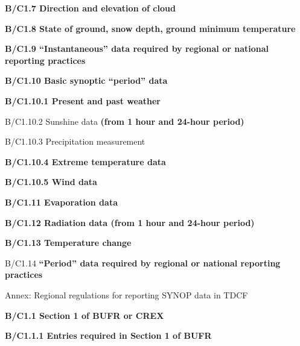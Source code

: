 \textbf{B/C1.7 Direction and elevation of cloud}

\textbf{B/C1.8 State of ground, snow depth, ground minimum temperature}

\textbf{B/C1.9 ``Instantaneous'' data required by regional or national reporting practices}

\textbf{B/C1.10 Basic synoptic ``period'' data}

\textbf{B/C1.10.1 Present and past weather}

B/C1.10.2 Sunshine data \textbf{(from 1 hour and 24-hour period)}

B/C1.10.3 Precipitation measurement

\textbf{B/C1.10.4 Extreme temperature data}

\textbf{B/C1.10.5 Wind data}

\textbf{B/C1.11 Evaporation data}

\textbf{B/C1.12 Radiation data (from 1 hour and 24-hour period)}

\textbf{B/C1.13 Temperature change}

B/C1.14 \textbf{``Period'' data required by regional or national reporting practices}

Annex: Regional regulations for reporting SYNOP data in TDCF

\textbf{B/C1.1 Section 1 of BUFR or CREX}

\textbf{B/C1.1.1 Entries required in Section 1 of BUFR}

